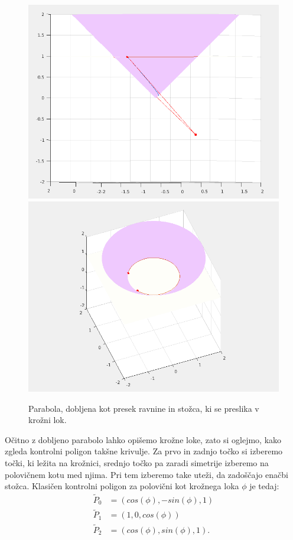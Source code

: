 \documentclass[a4paper,12pt]{article}
\begin{document}
\begin{figure}[h]
\includegraphics[scale=0.25]{kvadraticna.png}
\includegraphics[scale=0.25]{kvadraticna2.png}
\centering
\caption{Parabola, dobljena kot presek ravnine in stožca, ki se preslika v krožni lok.}
\end{figure}

Očitno z dobljeno parabolo lahko opišemo krožne loke, zato si oglejmo, kako zgleda kontrolni poligon takšne krivulje. Za prvo in zadnjo točko si izberemo točki, ki ležita na krožnici, srednjo točko pa zaradi simetrije izberemo na polovičnem kotu med njima. Pri tem izberemo take uteži, da zadoščajo enačbi stožca. Klasičen kontrolni poligon za polovični kot krožnega loka $\phi$ je tedaj:
\begin{align*}
\tilde{P}_0 &= (cos(\phi), -sin(\phi), 1)\\
\tilde{P}_1 &= (1, 0, cos(\phi))\\
\tilde{P}_2 &= (cos(\phi), sin(\phi), 1).
\end{align*}
\end{document}
